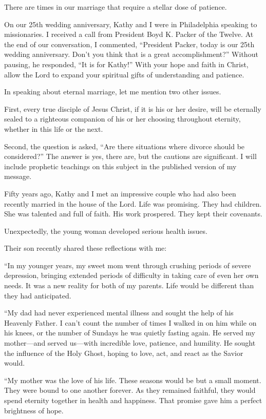 \documentclass[letterpaper, 11pt]{report}
\newcommand{\intalkheader}[1]{
    \vspace{0.75em}
    \noindent{\normalsize\bfseries #1}
    \par\nopagebreak %
    \vspace{0.25em}
    \nopagebreak     %
}
\begin{document}
There are times in our marriage that require a stellar dose of patience.

On our 25th wedding anniversary, Kathy and I were in Philadelphia speaking to missionaries. I received a call from President Boyd K. Packer of the Twelve. At the end of our conversation, I commented, “President Packer, today is our 25th wedding anniversary. Don’t you think that is a great accomplishment?” Without pausing, he responded, “It is for Kathy!” With your hope and faith in Christ, allow the Lord to expand your spiritual gifts of understanding and patience.

In speaking about eternal marriage, let me mention two other issues.

First, every true disciple of Jesus Christ, if it is his or her desire, will be eternally sealed to a righteous companion of his or her choosing throughout eternity, whether in this life or the next.

Second, the question is asked, “Are there situations where divorce should be considered?” The answer is yes, there are, but the cautions are significant. I will include prophetic teachings on this subject in the published version of my message.

\intalkheader{Caring for Each Other}

Fifty years ago, Kathy and I met an impressive couple who had also been recently married in the house of the Lord. Life was promising. They had children. She was talented and full of faith. His work prospered. They kept their covenants.

Unexpectedly, the young woman developed serious health issues.

Their son recently shared these reflections with me:

“In my younger years, my sweet mom went through crushing periods of severe depression, bringing extended periods of difficulty in taking care of even her own needs. It was a new reality for both of my parents. Life would be different than they had anticipated.

“My dad had never experienced mental illness and sought the help of his Heavenly Father. I can’t count the number of times I walked in on him while on his knees, or the number of Sundays he was quietly fasting again. He served my mother—and served us—with incredible love, patience, and humility. He sought the influence of the Holy Ghost, hoping to love, act, and react as the Savior would.

“My mother was the love of his life. These seasons would be but a small moment. They were bound to one another forever. As they remained faithful, they would spend eternity together in health and happiness. That promise gave him a perfect brightness of hope.
\end{document}
